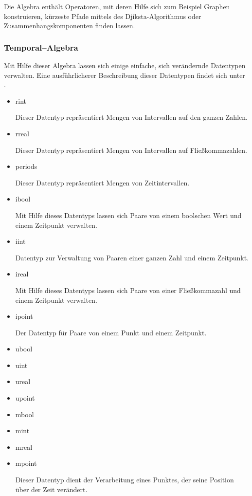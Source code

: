 Die Algebra enthält Operatoren, mit deren Hilfe sich zum Beispiel Graphen konstruieren, kürzeste Pfade mittels des Djiksta-Algorithmus oder Zusammenhangskomponenten finden lassen.

\subsubsection{Temporal--Algebra}

Mit Hilfe dieser Algebra lassen sich einige einfache, sich verändernde Datentypen verwalten. Eine ausführlicherer Beschreibung dieser Datentypen findet sich unter \cite{FGNS}.
\begin{itemize}
\item rint

Dieser Datentyp repräsentiert Mengen von Intervallen auf den ganzen Zahlen.
\item rreal

Dieser Datentyp repräsentiert Mengen von Intervallen auf Fließkommazahlen.
\item periods

Dieser Datentyp repräsentiert Mengen von Zeitintervallen.
\item ibool

Mit Hilfe dieses Datentyps lassen sich Paare von einem boolschen Wert und einem Zeitpunkt verwalten.
\item iint

Datentyp zur Verwaltung von Paaren einer ganzen Zahl und einem Zeitpunkt.
\item ireal

Mit Hilfe dieses Datentyps lassen sich Paare von einer Fließkommazahl und einem Zeitpunkt verwalten.
\item ipoint

Der Datentyp für Paare von einem Punkt und einem Zeitpunkt.
\item ubool

\item uint

\item ureal

\item upoint

\item mbool

\item mint

\item mreal

\item mpoint

Dieser Datentyp dient der Verarbeitung eines Punktes, der seine Position über der Zeit verändert.
\end{itemize}



